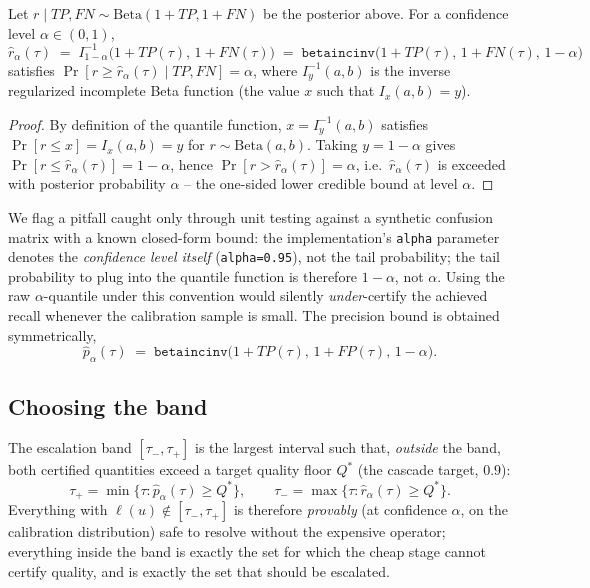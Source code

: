 \begin{proposition}
\label{prop:beta-bound}
Let $r\mid \mathit{TP},\mathit{FN} \sim \mathrm{Beta}(1+\mathit{TP},1+\mathit{FN})$
be the posterior above. For a confidence level $\alpha \in (0,1)$,
\[
  \widehat{r}_{\alpha}(\tau) \;=\; I^{-1}_{1-\alpha}\bigl(1+\mathit{TP}(\tau),\, 1+\mathit{FN}(\tau)\bigr)
  \;=\; \texttt{betaincinv}\bigl(1+\mathit{TP}(\tau),\, 1+\mathit{FN}(\tau),\, 1-\alpha\bigr)
\]
satisfies $\Pr[r \ge \widehat r_\alpha(\tau) \mid \mathit{TP}, \mathit{FN}] = \alpha$,
where $I^{-1}_y(a,b)$ is the inverse regularized incomplete Beta function
(the value $x$ such that $I_x(a,b)=y$).
\end{proposition}
\begin{proof}
By definition of the quantile function, $x=I^{-1}_y(a,b)$ satisfies
$\Pr[r \le x] = I_x(a,b) = y$ for $r\sim\mathrm{Beta}(a,b)$. Taking
$y=1-\alpha$ gives $\Pr[r \le \widehat r_\alpha(\tau)] = 1-\alpha$, hence
$\Pr[r > \widehat r_\alpha(\tau)] = \alpha$, i.e.\ $\widehat r_\alpha(\tau)$
is exceeded with posterior probability $\alpha$ -- the one-sided lower
credible bound at level $\alpha$.
\end{proof}
We flag a pitfall caught only through unit testing against a synthetic
confusion matrix with a known closed-form bound: the implementation's
\texttt{alpha} parameter denotes the \emph{confidence level itself}
(\eg \texttt{alpha=0.95}), not the tail probability; the tail probability
to plug into the quantile function is therefore $1-\alpha$, not $\alpha$.
Using the raw $\alpha$-quantile under this convention would silently
\emph{under}-certify the achieved recall whenever the calibration sample
is small. The precision bound is obtained symmetrically,
\[
  \widehat{p}_{\alpha}(\tau) \;=\; \texttt{betaincinv}\bigl(1+\mathit{TP}(\tau),\, 1+\mathit{FP}(\tau),\, 1-\alpha\bigr).
\]

\subsection{Choosing the band}
\label{sec:choosing-band}
The escalation band $[\tau_-, \tau_+]$ is the largest interval such
that, \emph{outside} the band, both certified quantities exceed a
target quality floor $Q^\ast$ (the cascade target, \eg $0.9$):
\[
  \tau_+ = \min\{\tau : \widehat{p}_\alpha(\tau) \ge Q^\ast\},
  \qquad
  \tau_- = \max\{\tau : \widehat{r}_\alpha(\tau) \ge Q^\ast\}.
\]
Everything with $\ell(u) \notin [\tau_-, \tau_+]$ is therefore
\emph{provably} (at confidence $\alpha$, on the calibration distribution)
safe to resolve without the expensive operator; everything inside the
band is exactly the set for which the cheap stage cannot certify
quality, and is exactly the set that should be escalated.

